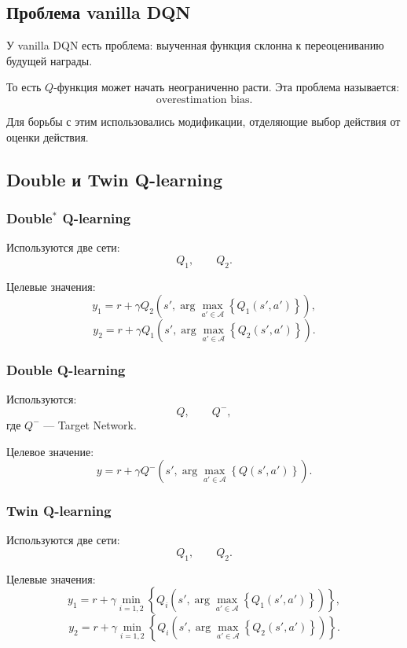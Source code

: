 \documentclass[12pt,a4paper]{article}
\begin{document}
\subsection{Проблема vanilla DQN}

У vanilla DQN есть проблема: выученная функция склонна к переоцениванию будущей награды.

То есть $Q$-функция может начать неограниченно расти. Эта проблема называется:
\[
\text{overestimation bias}.
\]

Для борьбы с этим использовались модификации, отделяющие выбор действия от оценки действия.

\subsection{Double и Twin Q-learning}

\subsubsection{Double$^\ast$ Q-learning}

Используются две сети:
\[
Q_1,
\qquad
Q_2.
\]

Целевые значения:
\[
y_1
=
r
+
\gamma
Q_2
\left(
s',
\arg\max_{a' \in \mathcal A}
\left\{
Q_1(s',a')
\right\}
\right),
\]
\[
y_2
=
r
+
\gamma
Q_1
\left(
s',
\arg\max_{a' \in \mathcal A}
\left\{
Q_2(s',a')
\right\}
\right).
\]

\subsubsection{Double Q-learning}

Используются:
\[
Q,
\qquad
Q^-,
\]
где $Q^-$ --- Target Network.

Целевое значение:
\[
y
=
r
+
\gamma
Q^-
\left(
s',
\arg\max_{a' \in \mathcal A}
\left\{
Q(s',a')
\right\}
\right).
\]

\subsubsection{Twin Q-learning}

Используются две сети:
\[
Q_1,
\qquad
Q_2.
\]

Целевые значения:
\[
y_1
=
r
+
\gamma
\min_{i=1,2}
\left\{
Q_i
\left(
s',
\arg\max_{a' \in \mathcal A}
\left\{
Q_1(s',a')
\right\}
\right)
\right\},
\]
\[
y_2
=
r
+
\gamma
\min_{i=1,2}
\left\{
Q_i
\left(
s',
\arg\max_{a' \in \mathcal A}
\left\{
Q_2(s',a')
\right\}
\right)
\right\}.
\]
\end{document}
